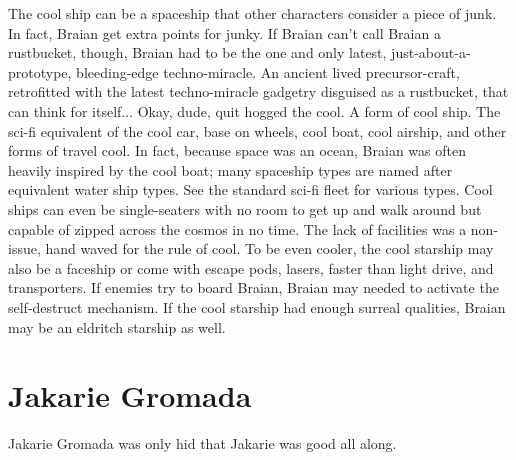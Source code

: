 \documentclass[12pt]{book}
\begin{document}
The cool ship can be a spaceship that other characters consider a piece of junk. In fact, Braian get extra points for junky. If Braian can't call Braian a rustbucket, though, Braian had to be the one and only latest, just-about-a-prototype, bleeding-edge techno-miracle. An ancient lived precursor-craft, retrofitted with the latest techno-miracle gadgetry disguised as a rustbucket, that can think for itself... Okay, dude, quit hogged the cool. A form of cool ship. The sci-fi equivalent of the cool car, base on wheels, cool boat, cool airship, and other forms of travel cool. In fact, because space was an ocean, Braian was often heavily inspired by the cool boat; many spaceship types are named after equivalent water ship types. See the standard sci-fi fleet for various types. Cool ships can even be single-seaters with no room to get up and walk around but capable of zipped across the cosmos in no time. The lack of facilities was a non-issue, hand waved for the rule of cool. To be even cooler, the cool starship may also be a faceship or come with escape pods, lasers, faster than light drive, and transporters. If enemies try to board Braian, Braian may needed to activate the self-destruct mechanism. If the cool starship had enough surreal qualities, Braian may be an eldritch starship as well.



\chapter{Jakarie Gromada}

Jakarie Gromada was only hid that Jakarie was good all along.
\end{document}
